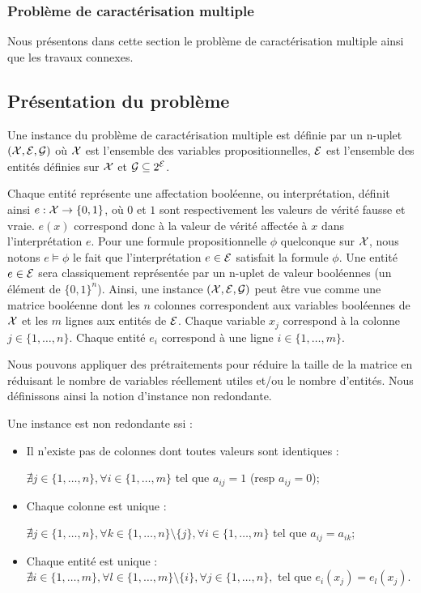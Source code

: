 \subsubsection{Problème de caractérisation multiple}
Nous présentons dans cette section le problème de caractérisation multiple ainsi que  les travaux connexes.

\subsection{Présentation du problème}

\begin{definition}
Une instance du problème de caractérisation multiple est définie par un n-uplet
$({\cal X}, {\cal E}, {\cal G})$ où $\cal X$ est l'ensemble des
variables propositionnelles, ${\cal E}$ est l'ensemble des entités définies sur
$\cal X$ et ${\cal G} \subseteq 2^{\cal E}$.
\end{definition}

Chaque entité représente une affectation booléenne, ou interprétation, définit ainsi  $e : {\cal X} \to \{0,1\}$, où  $0$ et $1$ sont respectivement les valeurs de vérité fausse et vraie. $e(x)$ correspond donc à la valeur de vérité affectée à $x$ dans l'interprétation $e$. Pour une formule propositionnelle  $\phi$ quelconque sur ${\cal X}$, nous notons $e \models \phi $ le fait que l'interprétation $e \in {\cal E}$ satisfait la formule $\phi$. Une entité $e \in {\cal E}$ sera classiquement représentée par un n-uplet de valeur booléennes (un élément de  $ \{0,1\}^n$).   Ainsi, une instance $({\cal X}, {\cal E}, {\cal G})$  peut être vue comme une matrice booléenne dont les $n$ colonnes correspondent aux variables booléennes de ${\cal X}$ et les $m$ lignes aux entités de ${\cal E}$.  Chaque variable $x_j$ correspond à la colonne $j \in \{1, \ldots, n \} $. Chaque entité $e_i$ correspond à une ligne $i \in \{1, \ldots, m \}$.

Nous pouvons appliquer des prétraitements pour réduire la taille de la matrice en réduisant le nombre de variables réellement utiles et/ou le nombre d'entités. Nous définissons ainsi la notion d'instance non redondante.

\begin{definition}
Une instance est non redondante ssi :
\begin{itemize}
\item Il n'existe pas de colonnes dont toutes valeurs sont identiques :

$\nexists j \in \{1,\ldots, n \},\forall i \in \{1, \ldots, m \} $ tel que $a_{ij}=1$ (resp $a_{ij}=0$);
\item Chaque colonne est unique :

$\nexists j \in \{1, \ldots, n \},\forall k \in \{1, \ldots, n \} \setminus \{j\}, \forall i \in \{1, \ldots, m \} $ tel que $a_{ij}=a_{ik}$;
\item Chaque entité est unique : \\$ \nexists i \in \{1, \ldots, m \},
\forall l \in \{1, \ldots, m \} \setminus \{i\},\forall j \in \{1, \ldots, n \},$ tel que $e_i(x_j)=e_l(x_j)$.
\end{itemize}
\end{definition}

